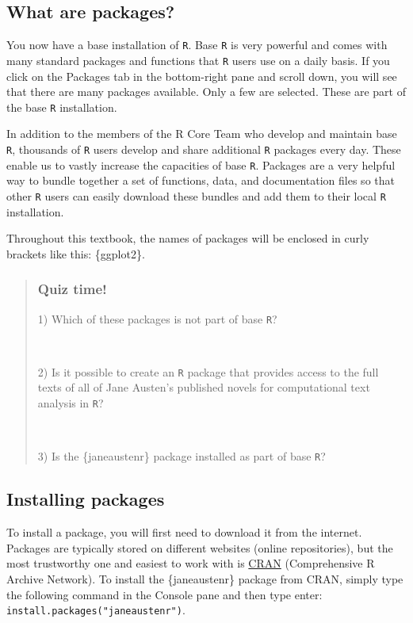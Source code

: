 \documentclass[
  letterpaper,
  DIV=11,
  numbers=noendperiod,
  oneside]{scrreprt}
\begin{document}
\subsection{What are packages?}\label{what-are-packages}

You now have a base installation of \texttt{R}. Base \texttt{R} is very
powerful and comes with many standard packages and functions that
\texttt{R} users use on a daily basis. If you click on the Packages tab
in the bottom-right pane and scroll down, you will see that there are
many packages available. Only a few are selected. These are part of the
base \texttt{R} installation.

In addition to the members of the R Core Team who develop and maintain
base \texttt{R}, thousands of \texttt{R} users develop and share
additional \texttt{R} packages every day. These enable us to vastly
increase the capacities of base \texttt{R}. Packages are a very helpful
way to bundle together a set of functions, data, and documentation files
so that other \texttt{R} users can easily download these bundles and add
them to their local \texttt{R} installation.

Throughout this textbook, the names of packages will be enclosed in
curly brackets like this: \{ggplot2\}.

\begin{quote}
\subsubsection*{Quiz time!}\label{quiz-time-1}

1) Which of these packages is not part of base \texttt{R}?

~

2) Is it possible to create an \texttt{R} package that provides access
to the full texts of all of Jane Austen's published novels for
computational text analysis in \texttt{R}?

~

3) Is the \{janeaustenr\} package installed as part of base \texttt{R}?
\end{quote}

\subsection{Installing packages}\label{installing-packages}

To install a package, you will first need to download it from the
internet. Packages are typically stored on different websites (online
repositories), but the most trustworthy one and easiest to work with is
\href{https://cran.rstudio.com/index.html}{CRAN} (Comprehensive R
Archive Network). To install the \{janeaustenr\} package from CRAN,
simply type the following command in the Console pane and then type
enter: \texttt{install.packages("janeaustenr")}.
\end{document}
